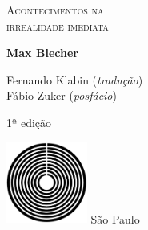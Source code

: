 




\begingroup\thispagestyle{empty}\vspace*{.05\textheight} 

              \formular
              \LARGE
              \noindent
              \textsc{Acontecimentos na\\irrealidade imediata}
                      
              \bigskip  
              
              \Large
              \noindent
              \textbf{Max Blecher}
              \vspace{2.5em}

              \newfontfamily{}
              {\fontsize{30}{40}\selectfont \minion\small\noindent Fernando Klabin (\textit{tradução})\\
              Fábio Zuker (\textit{posfácio})}
              \vspace{4em}

              \noindent
              {\fontsize{30}{40}\selectfont \minion\small\noindent 1ª edição}
                      
              \vfill
              \noindent
              \includegraphics[width=0.2\textwidth]{logo}
              \break{} 
              \smallskip
              {\fontsize{30}{40}\selectfont \minion\footnotesize\noindent São Paulo\quad\the\year}

\endgroup
\pagebreak
